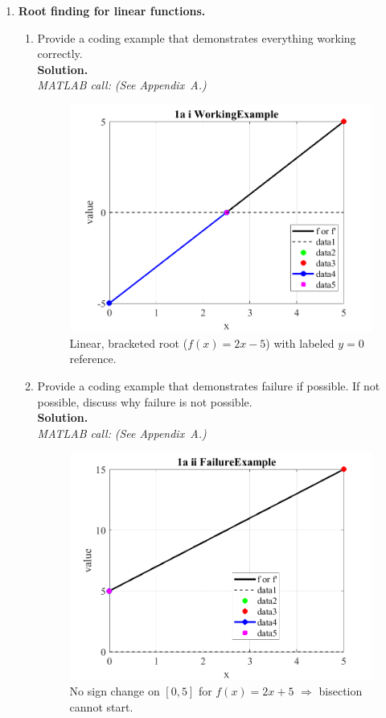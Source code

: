 \documentclass[11pt]{article}
\begin{document}
	\begin{enumerate}[label=1(\alph*)]
		
		\item \textbf{Root finding for linear functions.}
		\begin{enumerate}[label=\roman*)]
			
			\item Provide a coding example that demonstrates everything working correctly.\\
			\textbf{Solution.}\\
			\textit{MATLAB call:} \emph{(See Appendix~A.)}
			
			\begin{figure}[H]\centering
				\includegraphics[width=0.78\linewidth]{plots/1a_i_WorkingExample.png}
				\caption{Linear, bracketed root (\(f(x)=2x-5\)) with labeled \(y=0\) reference.}
			\end{figure}
			
			\item Provide a coding example that demonstrates failure if possible. If not possible, discuss why failure is not possible.\\
			\textbf{Solution.}\\
			\textit{MATLAB call:} \emph{(See Appendix~A.)}
			
			\begin{figure}[H]\centering
				\includegraphics[width=0.78\linewidth]{plots/1a_ii_FailureExample.png}
				\caption{No sign change on \([0,5]\) for \(f(x)=2x+5\) \(\Rightarrow\) bisection cannot start.}
			\end{figure}
			

\end{enumerate}
\end{enumerate}
\end{document}
